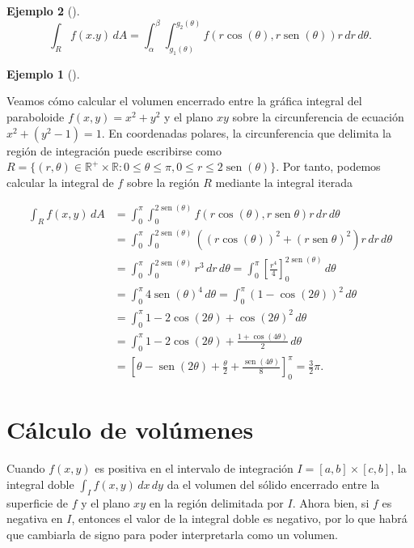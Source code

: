 \documentclass[
  a4paper,
]{scrreport}
\theoremstyle{definition}
\newtheorem{example}{Ejemplo}[chapter]
\theoremstyle{plain}
\theoremstyle{definition}
\theoremstyle{definition}
\theoremstyle{plain}
\theoremstyle{plain}
\theoremstyle{remark}
\begin{document}
\begin{example}[]
\[
\int_R f(x.y)\,dA 
= \int_{\alpha}^{\beta} \int_{g_1(\theta)}^{g_2(\theta)} f(r\cos(\theta),r\operatorname{sen}(\theta))r\,dr\,d\theta.
\]

\begin{example}[]\protect\hypertarget{exm-integral-region-irregular-polar}{}\label{exm-integral-region-irregular-polar}

Veamos cómo calcular el volumen encerrado entre la gráfica integral del
paraboloide \(f(x,y)=x^2+y^2\) y el plano \(xy\) sobre la circunferencia
de ecuación \(x^2+(y^2-1)=1\). En coordenadas polares, la circunferencia
que delimita la región de integración puede escribirse como
\(R=\{(r,\theta)\in \mathbb{R}^+\times \mathbb{R}: 0\leq \theta\leq \pi, 0\leq r\leq 2\operatorname{sen}(\theta)\}\).
Por tanto, podemos calcular la integral de \(f\) sobre la región \(R\)
mediante la integral iterada

\begin{align*}
\int_R f(x,y)\,dA
&= \int_0^\pi \int_0^{2\operatorname{sen}(\theta)} f(r\cos(\theta),r\operatorname{sen}{\theta})r\,dr\,d\theta \\
&= \int_0^\pi \int_0^{2\operatorname{sen}(\theta)} ((r\cos(\theta))^2 + (r\operatorname{sen}{\theta})^2)r\,dr\,d\theta \\
&= \int_0^\pi \int_0^{2\operatorname{sen}(\theta)} r^3\,dr\,d\theta 
= \int_0^\pi \left[\frac{r^4}{4}\right]_0^{2\operatorname{sen}(\theta)} \,d\theta \\
&= \int_0^\pi 4\operatorname{sen}(\theta)^4 \,d\theta 
= \int_0^\pi (1-\cos(2\theta))^2\,d\theta \\ 
&= \int_0^\pi 1 - 2\cos(2\theta) + \cos(2\theta)^2 \,d\theta \\
&= \int_0^\pi 1 - 2\cos(2\theta) + \frac{1+\cos(4\theta)}{2}\,d\theta \\
&= \left[\theta - \operatorname{sen}(2\theta) + \frac{\theta}{2} + \frac{\operatorname{sen}(4\theta)}{8}\right]_0^\pi
= \frac{3}{2}\pi.
\end{align*}

\end{example}

\section{Cálculo de volúmenes}\label{cuxe1lculo-de-voluxfamenes}

Cuando \(f(x,y)\) es positiva en el intervalo de integración
\(I=[a,b]\times[c,b]\), la integral doble \(\int_I f(x,y)\,dx\,dy\) da
el volumen del sólido encerrado entre la superficie de \(f\) y el plano
\(xy\) en la región delimitada por \(I\). Ahora bien, si \(f\) es
negativa en \(I\), entonces el valor de la integral doble es negativo,
por lo que habrá que cambiarla de signo para poder interpretarla como un
volumen.


\end{example}
\end{document}
